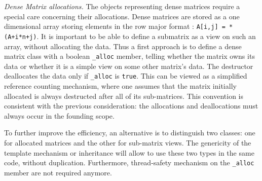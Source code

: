 \documentclass[runningheads,a4paper]{llncs}
\begin{document}
{\em Dense Matrix allocations.}
The objects representing dense matrices require a special care concerning  their
allocations. Dense matrices are stored as a one dimensional array storing
elements in the row major format : \texttt{A[i,j] = *(A+i*n+j)}. It is important
to be 
able to define a submatrix as a view on such an array, without allocating the
data. Thus a first approach is to define a dense matrix class with a
boolean \texttt{\_alloc} 
member, telling whether the matrix owns its data or whether it is a simple view
on some other matrix's data. The destructor deallocates the data only if
\texttt{\_alloc} is \texttt{true}. This can be viewed as a simplified
reference 
counting mechanism, where one assumes that the matrix initially allocated is
always destructed after all of its sub-matrices. This convention is consistent
with the previous consideration: the allocations and deallocations must always
occur in the founding scope.

To further improve the efficiency, an alternative is to distinguish
two classes: 
one for allocated matrices and the other for sub-matrix views. The
genericity of 
 the template mechanism or inheritance will allow to use these two
 types in the same code, without duplication. Furthermore,
 thread-safety mechanism on the \texttt{\_alloc} 
member are not required anymore.
\end{document}
